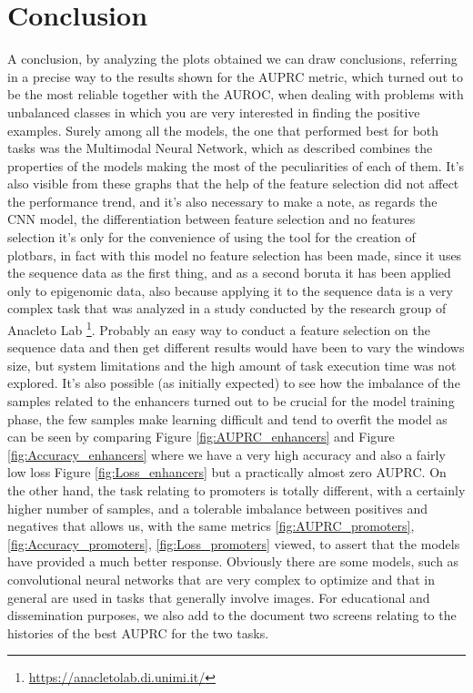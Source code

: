 \documentclass{article}
\begin{document}
\section{Conclusion}
\label{sec:Conclusion}
A conclusion, by analyzing the plots obtained we can draw conclusions, referring in a precise way to the results shown for the AUPRC metric, which turned out to be the most reliable together with the AUROC, when dealing with problems with unbalanced classes in which you are very interested in finding the positive examples. Surely among all the models, the one that performed best for both tasks was the Multimodal Neural Network, which as described combines the properties of the models making the most of the peculiarities of each of them. It's also visible from these graphs that the help of the feature selection did not affect the performance trend, and it's also necessary to make a note, as regards the CNN model, the differentiation between feature selection and no features selection it's only for the convenience of using the tool for the creation of plotbars, in fact with this model no feature selection has been made, since it uses the sequence data as the first thing, and as a second boruta it has been applied only to epigenomic data, also because applying it to the sequence data is a very complex task that was analyzed in a study \cite{computers9020037} conducted by the research group of Anacleto Lab \footnote{\url{https://anacletolab.di.unimi.it/}}. Probably an easy way to conduct a feature selection on the sequence data and then get different results would have been to vary the windows size, but system limitations and the high amount of task execution time was not explored. It's also possible (as initially expected) to see how the imbalance of the samples related to the enhancers turned out to be crucial for the model training phase, the few samples make learning difficult and tend to overfit the model as can be seen by comparing Figure \ref{fig:AUPRC_enhancers} and Figure \ref{fig:Accuracy_enhancers} where we have a very high accuracy and also a fairly low loss Figure \ref{fig:Loss_enhancers} but a practically almost zero AUPRC. On the other hand, the task relating to promoters is totally different, with a certainly higher number of samples, and a tolerable imbalance between positives and negatives that allows us, with the same metrics \ref{fig:AUPRC_promoters}, \ref{fig:Accuracy_promoters}, \ref{fig:Loss_promoters} viewed, to assert that the models have provided a much better response. Obviously there are some models, such as convolutional neural networks that are very complex to optimize and that in general are used in tasks that generally involve images. For educational and dissemination purposes, we also add to the document two screens relating to the histories of the best AUPRC for the two tasks.
\end{document}
